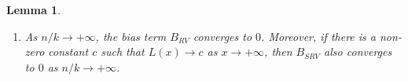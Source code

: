 \documentclass{article}
\numberwithin{equation}{section}
\newtheorem{lemma}{Lemma}[section]
\begin{document}
\begin{lemma}
\begin{enumerate}[label= (\roman*)]
            Then, the following inequality holds with probability larger
            than \(1-2\delta\):
            \begin{equation}\label{eq:relative_deviation}
                \sup_{\overline{u}_{n,k}\leq x\leq
                \exp{\left(\Delta_\alpha^{-\epsilon}\right)}\underline{u}_{n,k}}
                \left|\frac{\widehat{p}_x}{p_x}-1\right|\leq
                \frac{7}{4} \Delta_{\alpha}^{1-\epsilon} +
                4\sqrt{\frac{3\log(2/\delta)}{k}} +
                \frac{24\log(2/\delta)}{k} + \frac{8}{n} + 4B_{SRV}.
            \end{equation}

        \item As \(n/k\to+\infty\), the bias term
            \(B_{RV}\) converges to \(0\). Moreover, if there is
            a non-zero constant \(c\) such that \(L(x)\to c\) as
            \(x\to +\infty\),
            then \(B_{SRV}\) also converges to \(0\) as \(n/k\to+\infty\).
    \end{enumerate}

\end{lemma}
\end{document}
